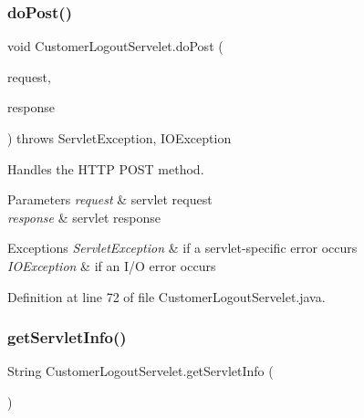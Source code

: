 \mbox{\label{class_customer_logout_servelet_aa53ae0f8d85d6e606c1ba73ee0323154}} 
\subsubsection{\texorpdfstring{doPost()}{doPost()}}
{\footnotesize\ttfamily void Customer\+Logout\+Servelet.\+do\+Post (\begin{DoxyParamCaption}\item[{Http\+Servlet\+Request}]{request,  }\item[{Http\+Servlet\+Response}]{response }\end{DoxyParamCaption}) throws Servlet\+Exception, I\+O\+Exception\hspace{0.3cm}{\ttfamily [protected]}}

Handles the H\+T\+TP {\ttfamily P\+O\+ST} method.


\begin{DoxyParams}{Parameters}
{\em request} & servlet request \\
\hline
{\em response} & servlet response \\
\hline
\end{DoxyParams}

\begin{DoxyExceptions}{Exceptions}
{\em Servlet\+Exception} & if a servlet-\/specific error occurs \\
\hline
{\em I\+O\+Exception} & if an I/O error occurs \\
\hline
\end{DoxyExceptions}


Definition at line 72 of file Customer\+Logout\+Servelet.\+java.

\mbox{\label{class_customer_logout_servelet_a171129d06a58f02bcc8d473e55abf47c}} 
\subsubsection{\texorpdfstring{getServletInfo()}{getServletInfo()}}
{\footnotesize\ttfamily String Customer\+Logout\+Servelet.\+get\+Servlet\+Info (\begin{DoxyParamCaption}{ }\end{DoxyParamCaption})}

